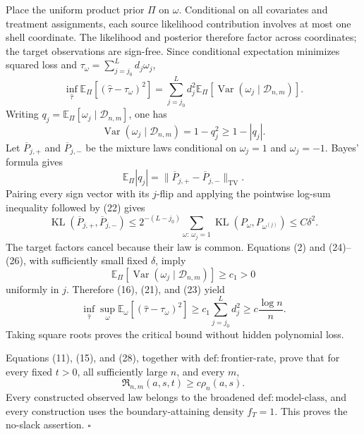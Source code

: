 Place the uniform product prior \(\Pi\) on \(\omega\).  Conditional on all covariates and treatment assignments, each source likelihood contribution involves at most one shell coordinate.  The likelihood and posterior therefore factor across coordinates; the target observations are sign-free.  Since conditional expectation minimizes squared loss and \(\tau_\omega=\sum_{j=j_0}^Ld_j\omega_j\),
\[
 \inf_{\widehat\tau}
 \mathbb E_\Pi[(\widehat\tau-\tau_\omega)^2]
 =\sum_{j=j_0}^Ld_j^2
   \mathbb E_\Pi[\operatorname{Var}(\omega_j\mid\mathcal D_{n,m})].
\tag{23}
\]
Writing \(q_j=\mathbb E_\Pi[\omega_j\mid\mathcal D_{n,m}]\), one has
\[
 \operatorname{Var}(\omega_j\mid\mathcal D_{n,m})
 =1-q_j^2\ge1-|q_j|.
\tag{24}
\]
Let \(\overline P_{j,+}\) and \(\overline P_{j,-}\) be the mixture laws conditional on \(\omega_j=1\) and \(\omega_j=-1\).  Bayes' formula gives
\[
 \mathbb E_\Pi|q_j|
 =\lVert\overline P_{j,+}-\overline P_{j,-}\rVert_{\mathrm{TV}}.
\tag{25}
\]
Pairing every sign vector with its \(j\)-flip and applying the pointwise log-sum inequality followed by (22) gives
\[
 \operatorname{KL}(\overline P_{j,+},\overline P_{j,-})
 \le 2^{-(L-j_0)}
 \sum_{\omega:\,\omega_j=1}
 \operatorname{KL}(P_\omega,P_{\omega^{(j)}})
 \le C\delta^2.
\tag{26}
\]
The target factors cancel because their law is common.  Equations (2) and (24)--(26), with sufficiently small fixed \(\delta\), imply
\[
 \mathbb E_\Pi[\operatorname{Var}
   (\omega_j\mid\mathcal D_{n,m})]
 \ge c_1>0
\tag{27}
\]
uniformly in \(j\).  Therefore (16), (21), and (23) yield
\[
 \inf_{\widehat\tau}\sup_\omega
 \mathbb E_\omega[(\widehat\tau-\tau_\omega)^2]
 \ge c_1\sum_{j=j_0}^Ld_j^2
 \ge c\frac{\log n}{n}.
\tag{28}
\]
Taking square roots proves the critical bound without hidden polynomial loss.

Equations (11), (15), and (28), together with \(\mathrm{def:frontier\text{-}rate}\), prove that for every fixed \(t>0\), all sufficiently large \(n\), and every \(m\),
\[
 \mathfrak R_{n,m}(a,s,t)\ge c\rho_n(a,s).
\]
Every constructed observed law belongs to the broadened \(\mathrm{def:model\text{-}class}\), and every construction uses the boundary-attaining density \(f_T=1\).  This proves the no-slack assertion. \(\square\)